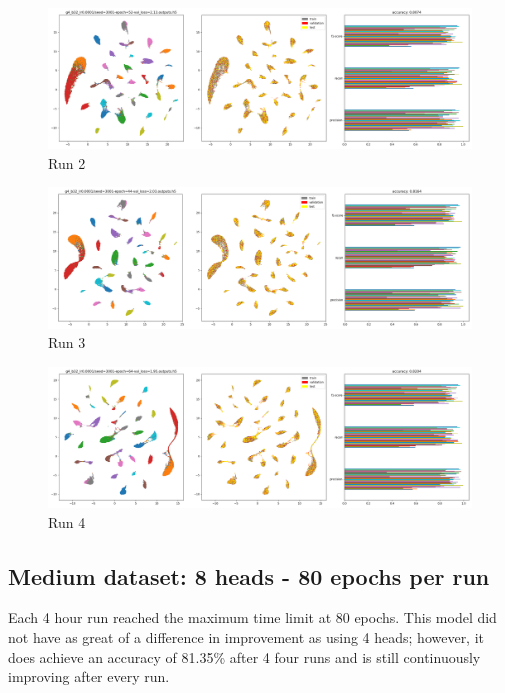 \documentclass{article}
\begin{document}
\begin{figure}[h!]
  \includegraphics[width=\linewidth]{new_journal/figures/experiments/roznet_multi/4_heads/run2.png}
  \caption{Run 2}
\end{figure}

\begin{figure}[h!]
  \includegraphics[width=\linewidth]{new_journal/figures/experiments/roznet_multi/4_heads/run3.png}
  \caption{Run 3}
\end{figure}

\begin{figure}[h!]
  \includegraphics[width=\linewidth]{new_journal/figures/experiments/roznet_multi/4_heads/run4.png}
  \caption{Run 4}
\end{figure}

\vfill
\clearpage

\subsection*{Medium dataset: 8 heads - 80 epochs per run}
Each 4 hour run reached the maximum time limit at 80 epochs. This model did not have as great of a difference in improvement as using 4 heads; however, it does achieve an accuracy of 81.35\% after 4 four runs and is still continuously improving after every run. 
\end{document}
